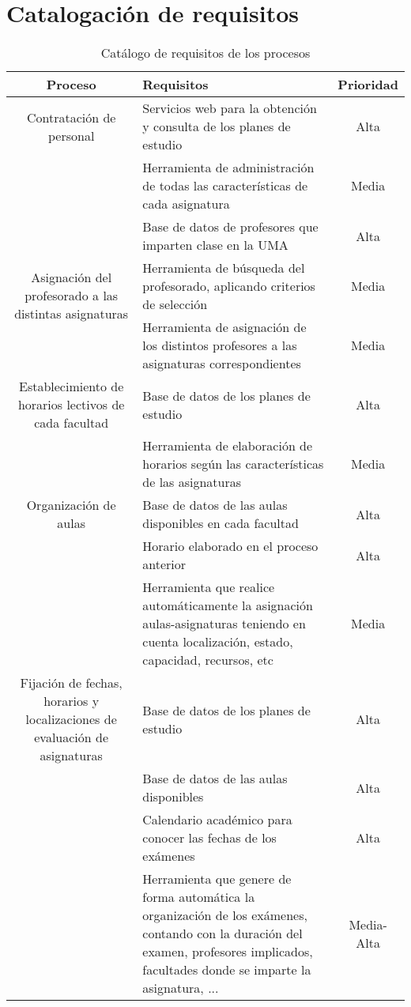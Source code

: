 \documentclass[11pt,a4paper,spanish,twoside]{book}
\begin{document}
\section{Catalogación de requisitos}
\begin{table}[!h]
\centering
  \begin{tabular}{clc}
    \textbf{Proceso} & \textbf{Requisitos} & \textbf{Prioridad} \\ \hline
    \hline \hline
     \multirow{}{*}{Contratación de personal}
     \multirow{2}{*}{Implantación de los planes de estudio de cada
       carrera}
     & Servicios web para la obtención y consulta de los planes de estudio &
     Alta\\
     & Herramienta de administración de todas las características de cada
     asignatura & Media\\ 

     \multirow{3}{*}{Asignación del profesorado a las distintas asignaturas}
     & Base de datos de profesores que imparten clase en la UMA & Alta \\ 
     & Herramienta de búsqueda del profesorado, aplicando criterios de selección
     & Media\\ 
     & Herramienta de asignación de los distintos profesores a las
     asignaturas correspondientes & Media\\ 
     
     \multirow{}{*}{Establecimiento de horarios lectivos de cada facultad}
     & Base de datos de los planes de estudio & Alta\\ 
     & Herramienta de elaboración de horarios según las características de
     las asignaturas & Media \\

     \multirow{}{*}{Organización de aulas}
     & Base de datos de las aulas disponibles en cada facultad & Alta\\
     & Horario elaborado en el proceso anterior & Alta \\
     & Herramienta que realice automáticamente la asignación
     aulas-asignaturas teniendo en cuenta localización, estado, capacidad,
     recursos, etc & Media \\

     \multirow{}{*}{Fijación de fechas, horarios y localizaciones de
       evaluación de asignaturas} 
     & Base de datos de los planes de estudio & Alta \\
     & Base de datos de las aulas disponibles & Alta \\
     & Calendario académico para conocer las fechas de los exámenes & Alta \\
     & Herramienta que genere de forma automática la organización de los
     exámenes, contando con la duración del examen, profesores implicados,
     facultades donde se imparte la asignatura, ... & Media-Alta \\
     
  \end{tabular}
\caption{Catálogo de requisitos de los procesos}
\end{table}
\end{document}
